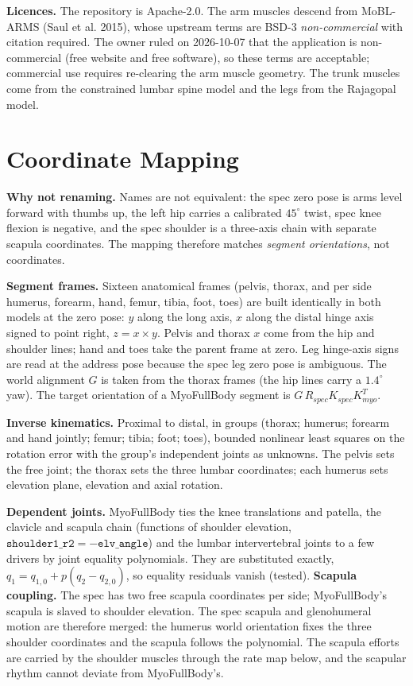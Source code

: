 \documentclass[11pt,a4paper]{article}
\begin{document}
\textbf{Licences.} The repository is Apache-2.0. The arm muscles descend from MoBL-ARMS (Saul et al. 2015), whose upstream terms are BSD-3 \emph{non-commercial} with citation required. The owner ruled on 2026-10-07 that the application is non-commercial (free website and free software), so these terms are acceptable; commercial use requires re-clearing the arm muscle geometry. The trunk muscles come from the constrained lumbar spine model and the legs from the Rajagopal model.

\section{Coordinate Mapping}
\textbf{Why not renaming.} Names are not equivalent: the spec zero pose is arms level forward with thumbs up, the left hip carries a calibrated $45^\circ$ twist, spec knee flexion is negative, and the spec shoulder is a three-axis chain with separate scapula coordinates. The mapping therefore matches \emph{segment orientations}, not coordinates.

\textbf{Segment frames.} Sixteen anatomical frames (pelvis, thorax, and per side humerus, forearm, hand, femur, tibia, foot, toes) are built identically in both models at the zero pose: $y$ along the long axis, $x$ along the distal hinge axis signed to point right, $z=x\times y$. Pelvis and thorax $x$ come from the hip and shoulder lines; hand and toes take the parent frame at zero. Leg hinge-axis signs are read at the address pose because the spec leg zero pose is ambiguous. The world alignment $G$ is taken from the thorax frames (the hip lines carry a $1.4^\circ$ yaw). The target orientation of a MyoFullBody segment is $G\,R_{spec}K_{spec}K_{myo}^{T}$.

\textbf{Inverse kinematics.} Proximal to distal, in groups (thorax; humerus; forearm and hand jointly; femur; tibia; foot; toes), bounded nonlinear least squares on the rotation error with the group's independent joints as unknowns. The pelvis sets the free joint; the thorax sets the three lumbar coordinates; each humerus sets elevation plane, elevation and axial rotation.

\textbf{Dependent joints.} MyoFullBody ties the knee translations and patella, the clavicle and scapula chain (functions of shoulder elevation, $\texttt{shoulder1\_r2}=-\texttt{elv\_angle}$) and the lumbar intervertebral joints to a few drivers by joint equality polynomials. They are substituted exactly, $q_1=q_{1,0}+p(q_2-q_{2,0})$, so equality residuals vanish (tested). \textbf{Scapula coupling.} The spec has two free scapula coordinates per side; MyoFullBody's scapula is slaved to shoulder elevation. The spec scapula and glenohumeral motion are therefore merged: the humerus world orientation fixes the three shoulder coordinates and the scapula follows the polynomial. The scapula efforts are carried by the shoulder muscles through the rate map below, and the scapular rhythm cannot deviate from MyoFullBody's.
\end{document}
